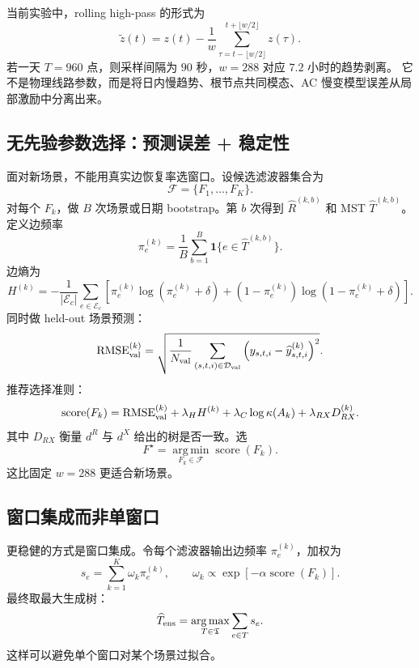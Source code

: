\documentclass[UTF8,11pt]{ctexart}
\newcommand{\argmin}{\operatorname*{arg\,min}}
\newcommand{\argmax}{\operatorname*{arg\,max}}
\begin{document}
当前实验中，rolling high-pass 的形式为
\[
    \widetilde z(t)=z(t)-\frac{1}{w}\sum_{\tau=t-\lfloor w/2\rfloor}^{t+\lfloor w/2\rfloor}z(\tau).
    \label{eq:rolling-hp}
\]
若一天 $T=960$ 点，则采样间隔为 $90$ 秒，$w=288$ 对应 $7.2$ 小时的趋势剥离。
它不是物理线路参数，而是将日内慢趋势、根节点共同模态、AC 慢变模型误差从局部激励中分离出来。

\subsection{无先验参数选择：预测误差 + 稳定性}

面对新场景，不能用真实边恢复率选窗口。设候选滤波器集合为
\[
    \mathcal{F}=\{F_1,\ldots,F_K\}.
\]
对每个 $F_k$，做 $B$ 次场景或日期 bootstrap。第 $b$ 次得到 $\widehat R^{(k,b)}$ 和 MST
$\widehat T^{(k,b)}$。定义边频率
\begin{equation}
    \pi_e^{(k)}=\frac{1}{B}\sum_{b=1}^B \mathbf{1}\{e\in\widehat T^{(k,b)}\}.
    \label{eq:edge-frequency}
\end{equation}
边熵为
\begin{equation}
    H^{(k)}
    =
    -\frac{1}{|\mathcal{E}_c|}
    \sum_{e\in\mathcal{E}_c}
    \left[
      \pi_e^{(k)}\log(\pi_e^{(k)}+\delta)
      +(1-\pi_e^{(k)})\log(1-\pi_e^{(k)}+\delta)
    \right].
    \label{eq:edge-entropy}
\end{equation}
同时做 held-out 场景预测：
\begin{equation}
    {\rm RMSE}_{\rm val}^{(k)}
    =
    \sqrt{
    \frac{1}{N_{\rm val}}
    \sum_{(s,t,i)\in\mathcal{D}_{\rm val}}
    \left(y_{s,t,i}-\widehat y_{s,t,i}^{(k)}\right)^2}.
    \label{eq:validation-rmse}
\end{equation}
推荐选择准则：
\begin{equation}
    \operatorname{score}(F_k)
    =
    {\rm RMSE}_{\rm val}^{(k)}
    +\lambda_H H^{(k)}
    +\lambda_C \log \kappa(A_k)
    +\lambda_{RX}D_{RX}^{(k)}.
    \label{eq:filter-score}
\end{equation}
其中 $D_{RX}$ 衡量 $d^R$ 与 $d^X$ 给出的树是否一致。选
\[
    F^\star=\argmin_{F_k\in\mathcal{F}}\operatorname{score}(F_k).
\]
这比固定 $w=288$ 更适合新场景。

\subsection{窗口集成而非单窗口}

更稳健的方式是窗口集成。令每个滤波器输出边频率 $\pi_e^{(k)}$，加权为
\begin{equation}
    s_e=\sum_{k=1}^K \omega_k\pi_e^{(k)},\qquad
    \omega_k\propto \exp[-\alpha \operatorname{score}(F_k)].
    \label{eq:ensemble-score}
\end{equation}
最终取最大生成树：
\begin{equation}
    \widehat T_{\rm ens}
    =
    \argmax_{T\in\mathfrak{T}}
    \sum_{e\in T}s_e.
    \label{eq:ensemble-tree}
\end{equation}
这样可以避免单个窗口对某个场景过拟合。
\end{document}
